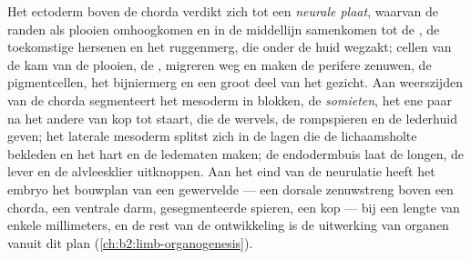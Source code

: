 \begin{proposition}\label{prop:b2:vertebrate-development:neurulation}
Het ectoderm boven de chorda verdikt zich tot een \emph{neurale plaat},
waarvan de randen als plooien omhoogkomen en in de middellijn samenkomen
tot de \emph{}, de toekomstige hersenen en het ruggenmerg, die
onder de huid wegzakt; cellen van de kam van de plooien, de \emph{}, migreren weg en maken de perifere zenuwen, de pigmentcellen, het
bijniermerg en een groot deel van het gezicht. Aan weerszijden van de
chorda segmenteert het mesoderm in blokken, de \emph{somieten}, het ene paar
na het andere van kop tot staart, die de wervels, de rompspieren en de
lederhuid geven; het laterale mesoderm splitst zich in de lagen die de
lichaamsholte bekleden en het hart en de ledematen maken; de endodermbuis
laat de longen, de lever en de alvleesklier uitknoppen. Aan het eind van de
neurulatie heeft het embryo het bouwplan van een gewervelde --- een dorsale
zenuwstreng boven een chorda, een ventrale darm, gesegmenteerde spieren, een
kop --- bij een lengte van enkele millimeters, en de rest van de
ontwikkeling is de uitwerking van organen vanuit dit plan
(\cref{ch:b2:limb-organogenesis}).
\end{proposition}

